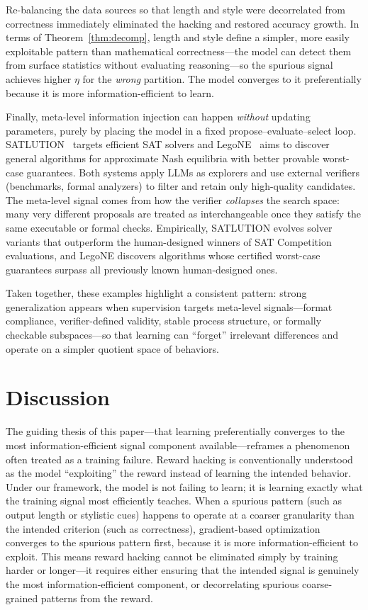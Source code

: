 \documentclass{article}
\theoremstyle{plain}
\theoremstyle{definition}
\theoremstyle{remark}
\begin{document}
Re-balancing the data sources so that length and style were decorrelated from correctness immediately eliminated the hacking and restored accuracy growth. In terms of Theorem~\ref{thm:decomp}, length and style define a simpler, more easily exploitable pattern than mathematical correctness---the model can detect them from surface statistics without evaluating reasoning---so the spurious signal achieves higher $\eta$ for the \textit{wrong} partition. The model converges to it preferentially because it is more information-efficient to learn.

Finally, meta-level information injection can happen \textit{without} updating parameters, purely by placing the model in a fixed propose--evaluate--select loop. SATLUTION~\cite{sunAutomaticallyDiscoveringHeuristics2025} targets efficient SAT solvers and LegoNE~\cite{liDiscoveringExpertLevelNash2025} aims to discover general algorithms for approximate Nash equilibria with better provable worst-case guarantees. Both systems apply LLMs as explorers and use external verifiers (benchmarks, formal analyzers) to filter and retain only high-quality candidates. The meta-level signal comes from how the verifier \textit{collapses} the search space: many very different proposals are treated as interchangeable once they satisfy the same executable or formal checks. Empirically, SATLUTION evolves solver variants that outperform the human-designed winners of SAT Competition evaluations, and LegoNE discovers algorithms whose certified worst-case guarantees surpass all previously known human-designed ones.

Taken together, these examples highlight a consistent pattern: strong generalization appears when supervision targets meta-level signals---format compliance, verifier-defined validity, stable process structure, or formally checkable subspaces---so that learning can ``forget'' irrelevant differences and operate on a simpler quotient space of behaviors.

\section{Discussion}

The guiding thesis of this paper---that learning preferentially converges to the most information-efficient signal component available---reframes a phenomenon often treated as a training failure. Reward hacking is conventionally understood as the model ``exploiting'' the reward instead of learning the intended behavior. Under our framework, the model is not failing to learn; it is learning exactly what the training signal most efficiently teaches. When a spurious pattern (such as output length or stylistic cues) happens to operate at a coarser granularity than the intended criterion (such as correctness), gradient-based optimization converges to the spurious pattern first, because it is more information-efficient to exploit. This means reward hacking cannot be eliminated simply by training harder or longer---it requires either ensuring that the intended signal is genuinely the most information-efficient component, or decorrelating spurious coarse-grained patterns from the reward.
\end{document}
